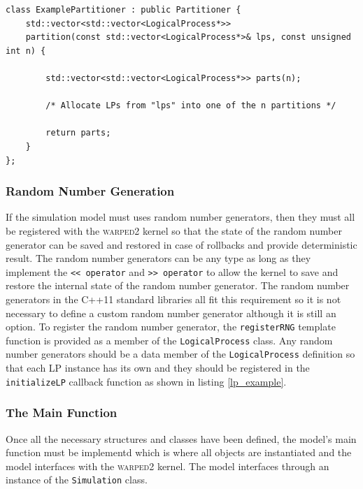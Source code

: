 \documentclass[11pt]{book}
\begin{document}
\begin{lstlisting}[caption=Example \textsc{warped2} Partitioner Definition, label=partitioner_example, float]
class ExamplePartitioner : public Partitioner {
    std::vector<std::vector<LogicalProcess*>>
    partition(const std::vector<LogicalProcess*>& lps, const unsigned int n) {

        std::vector<std::vector<LogicalProcess*>> parts(n);
        
        /* Allocate LPs from "lps" into one of the n partitions */

        return parts;
    }
};
\end{lstlisting}

\subsubsection{Random Number Generation}

If the simulation model must uses random number generators, then they must all be registered
with the \textsc{warped2} kernel so that the state of the random number generator can be saved and
restored in case of rollbacks and provide deterministic result.  The random number generators
can be any type as long as they implement the \texttt{<< operator} and \texttt{>> operator} to
allow the kernel to save and restore the internal state of the random number generator.  The
random number generators in the C++11 standard libraries \cite{c++11-rng} all fit this requirement
so it is not necessary to define a custom random number generator although it is still an
option.  To register the random number generator, the \texttt{registerRNG} template
function is provided as a member of the \texttt{LogicalProcess} class.  Any random number
generators should be a data member of the \texttt{LogicalProcess} definition so that each
LP instance has its own and they should be registered in the \texttt{initializeLP} callback
function as shown in listing \ref{lp_example}.

\subsubsection{The Main Function}

Once all the necessary structures and classes have been defined, the model's main function
must be implementd which is where all objects are instantiated and the model interfaces
with the \textsc{warped2} kernel. The model interfaces through an instance of the \texttt{Simulation}
class.
\end{document}
